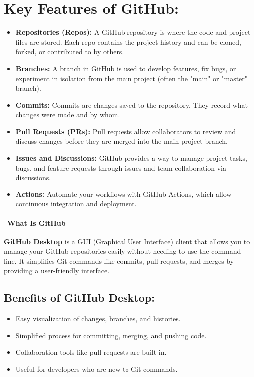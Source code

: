 \documentclass[a4paper,14pt]{article}
\begin{document}
\section*{Key Features of GitHub:}
\begin{itemize}
    \item \textbf{Repositories (Repos):} A GitHub repository is where the code and project files are stored. Each repo contains the project history and can be cloned, forked, or contributed to by others.
    \item \textbf{Branches:} A branch in GitHub is used to develop features, fix bugs, or experiment in isolation from the main project (often the "main" or "master" branch).
    \item \textbf{Commits:} Commits are changes saved to the repository. They record what changes were made and by whom.
    \item \textbf{Pull Requests (PRs):} Pull requests allow collaborators to review and discuss changes before they are merged into the main project branch.
    \item \textbf{Issues and Discussions:} GitHub provides a way to manage project tasks, bugs, and feature requests through issues and team collaboration via discussions.
    \item \textbf{Actions:} Automate your workflows with GitHub Actions, which allow continuous integration and deployment.
\end{itemize}

\vspace{20pt}
\begin{center}
\begin{tabular}{|p{0.40\linewidth}|}
    \hline
    \huge \textbf{What Is GitHub} \\
    \hline
    \end{tabular}
    \end{center}
    \vspace{20pt}
    
\textbf{GitHub Desktop} is a GUI (Graphical User Interface) client that allows you to manage your GitHub repositories easily without needing to use the command line. It simplifies Git commands like commits, pull requests, and merges by providing a user-friendly interface.

\vspace{10pt}

\subsection*{Benefits of GitHub Desktop:}
\begin{itemize}
    \item Easy visualization of changes, branches, and histories.
    \item Simplified process for committing, merging, and pushing code.
    \item Collaboration tools like pull requests are built-in.
    \item Useful for developers who are new to Git commands.
\end{itemize}
\end{document}
